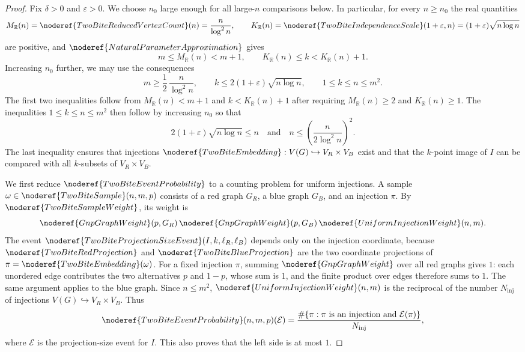 \begin{proof}
Fix \(\delta>0\) and \(\varepsilon>0\).  We choose \(n_0\) large enough for all
large-\(n\) comparisons below.  In particular, for every \(n\ge n_0\) the real
quantities
\[
M_{\mathbb R}(n)=\noderef{TwoBiteReducedVertexCount}(n)=\frac{n}{\log^2 n},
\qquad
K_{\mathbb R}(n)=\noderef{TwoBiteIndependenceScale}(1+\varepsilon,n)
  =(1+\varepsilon)\sqrt{n\log n}
\]
are positive, and \(\noderef{NaturalParameterApproximation}\) gives
\[
m\le M_{\mathbb R}(n)<m+1,\qquad
K_{\mathbb R}(n)\le k<K_{\mathbb R}(n)+1.
\]
Increasing \(n_0\) further, we may use the consequences
\[
m\ge \frac12\,\frac{n}{\log^2 n},\qquad
k\le 2(1+\varepsilon)\sqrt{n\log n},\qquad
1\le k\le n\le m^2.
\tag{2}
\]
The first two inequalities follow from \(M_{\mathbb R}(n)<m+1\) and
\(k<K_{\mathbb R}(n)+1\) after requiring
\(M_{\mathbb R}(n)\ge2\) and \(K_{\mathbb R}(n)\ge1\).  The inequalities
\(1\le k\le n\le m^2\) then follow by increasing \(n_0\) so that
\[
2(1+\varepsilon)\sqrt{n\log n}\le n
\quad\text{and}\quad
n\le\left(\frac{n}{2\log^2 n}\right)^2.
\]
The last inequality ensures that injections
\(\noderef{TwoBiteEmbedding}:V(G)\hookrightarrow V_R\times V_B\) exist and that
the \(k\)-point image of \(I\) can be compared with all \(k\)-subsets of
\(V_R\times V_B\).

We first reduce \(\noderef{TwoBiteEventProbability}\) to a counting problem for
uniform injections.  A sample
\(\omega\in\noderef{TwoBiteSample}(n,m,p)\) consists of a red graph \(G_R\), a
blue graph \(G_B\), and an injection \(\pi\).  By
\(\noderef{TwoBiteSampleWeight}\), its weight is
\[
\noderef{GnpGraphWeight}(p,G_R)\,
\noderef{GnpGraphWeight}(p,G_B)\,
\noderef{UniformInjectionWeight}(n,m).
\]
The event \(\noderef{TwoBiteProjectionSizeEvent}(I,k,\ell_R,\ell_B)\) depends
only on the injection coordinate, because
\(\noderef{TwoBiteRedProjection}\) and \(\noderef{TwoBiteBlueProjection}\) are
the two coordinate projections of \(\pi=\noderef{TwoBiteEmbedding}(\omega)\).
For a fixed injection \(\pi\), summing \(\noderef{GnpGraphWeight}\) over all red
graphs gives \(1\): each unordered edge contributes the two alternatives
\(p\) and \(1-p\), whose sum is \(1\), and the finite product over edges
therefore sums to \(1\).  The same argument applies to the blue graph.  Since
\(n\le m^2\), \(\noderef{UniformInjectionWeight}(n,m)\) is the reciprocal of
the number \(N_{\mathrm{inj}}\) of injections \(V(G)\hookrightarrow
V_R\times V_B\).  Thus
\[
\noderef{TwoBiteEventProbability}(n,m,p)(\mathcal E)
=\frac{\#\{\pi:\pi\text{ is an injection and }\mathcal E(\pi)\}}
       {N_{\mathrm{inj}}},
\]
where \(\mathcal E\) is the projection-size event for \(I\).  This also proves
that the left side is at most \(1\).


\end{proof}
